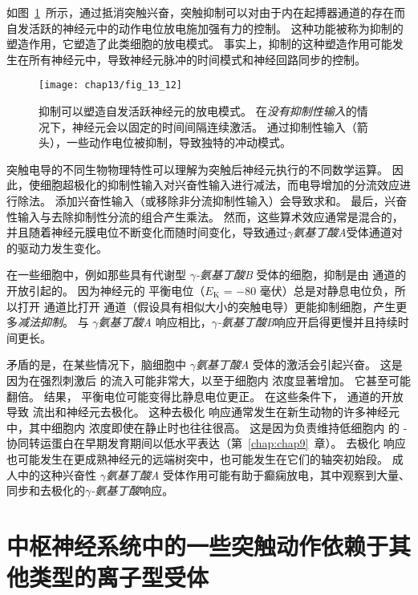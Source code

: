 如图~\ref{fig:13_12}~所示，通过抵消突触兴奋，突触抑制可以对由于内在起搏器通道的存在而自发活跃的神经元中的动作电位放电施加强有力的控制。
这种功能被称为抑制的塑造作用，它塑造了此类细胞的放电模式。
事实上，抑制的这种塑造作用可能发生在所有神经元中，导致神经元脉冲的时间模式和神经回路同步的控制。


\begin{figure}[htbp]
	\centering
	\texttt{[image: chap13/fig\_13\_12]}
	\caption{抑制可以塑造自发活跃神经元的放电模式。
		在\textit{没有抑制性输入}的情况下，神经元会以固定的时间间隔连续激活。
		通过抑制性输入（箭头），一些动作电位被抑制，导致独特的冲动模式。}
	\label{fig:13_12}
\end{figure}


突触电导的不同生物物理特性可以理解为突触后神经元执行的不同数学运算。
因此，使细胞超极化的抑制性输入对兴奋性输入进行减法，而电导增加的分流效应进行除法。
添加兴奋性输入（或移除非分流抑制性输入）会导致求和。
最后，兴奋性输入与去除抑制性分流的组合产生乘法。
然而，这些算术效应通常是混合的，并且随着神经元膜电位不断变化而随时间变化，导致通过\textit{$\gamma$氨基丁酸A}受体通道对  的驱动力发生变化。


在一些细胞中，例如那些具有代谢型 \textit{$\gamma$-氨基丁酸B} 受体的细胞，抑制是由  通道的开放引起的。
因为神经元的  平衡电位（$E_\text{K}$ = −80 毫伏）总是对静息电位负，所以打开  通道比打开  通道（假设具有相似大小的突触电导）更能抑制细胞，产生更多\textit{减法抑制}。
与 \textit{$\gamma$氨基丁酸A} 响应相比，\textit{$\gamma$-氨基丁酸B}响应开启得更慢并且持续时间更长。


矛盾的是，在某些情况下，脑细胞中 \textit{$\gamma$氨基丁酸A} 受体的激活会引起兴奋。
这是因为在强烈刺激后  的流入可能非常大，以至于细胞内  浓度显著增加。
它甚至可能翻倍。
结果， 平衡电位可能变得比静息电位更正。
在这些条件下， 通道的开放导致  流出和神经元去极化。
这种去极化  响应通常发生在新生动物的许多神经元中，其中细胞内  浓度即使在静止时也往往很高。
这是因为负责维持低细胞内  的 - 协同转运蛋白在早期发育期间以低水平表达（第~\ref{chap:chap9}~章）。
去极化  响应也可能发生在更成熟神经元的远端树突中，也可能发生在它们的轴突初始段。
成人中的这种兴奋性 \textit{$\gamma$氨基丁酸A} 受体作用可能有助于癫痫放电，其中观察到大量、同步和去极化的\textit{$\gamma$-氨基丁酸}响应。



\section{中枢神经系统中的一些突触动作依赖于其他类型的离子型受体}

